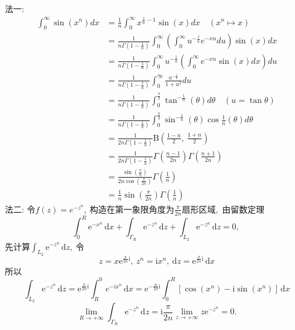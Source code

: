 	\begin{solution}
		法一:
		$$\begin{aligned}
			\int_{0}^{\infty} \sin \left(x^{n}\right) d x & =\frac{1}{n} \int_{0}^{\infty} x^{\frac{1}{n}-1} \sin (x) d x \quad\left(x^{n} \mapsto x\right) \\
			& =\frac{1}{n \Gamma\left(1-\frac{1}{n}\right)} \int_{0}^{\infty}\left(\int_{0}^{\infty} u^{-\frac{1}{n}} e^{-x u} d u\right) \sin (x) d x \\
			& =\frac{1}{n \Gamma\left(1-\frac{1}{n}\right)} \int_{0}^{\infty} u^{-\frac{1}{n}}\left(\int_{0}^{\infty} e^{-x u} \sin (x) d x\right) d u \\
			& =\frac{1}{n \Gamma\left(1-\frac{1}{n}\right)} \int_{0}^{\infty} \frac{u^{-\frac{1}{n}}}{1+u^{2}} d u \\
			& =\frac{1}{n \Gamma\left(1-\frac{1}{n}\right)} \int_{0}^{\frac{\pi}{2}} \tan ^{-\frac{1}{n}}(\theta) d \theta \quad(u=\tan \theta) \\
			& =\frac{1}{n \Gamma\left(1-\frac{1}{n}\right)} \int_{0}^{\frac{\pi}{2}} \sin ^{-\frac{1}{n}}(\theta) \cos \frac{1}{n}(\theta) d \theta \\
			& =\frac{1}{2 n \Gamma\left(1-\frac{1}{n}\right)} \mathrm{B}\left(\frac{1-n}{2},\  \frac{1+n}{2}\right) \\
			& =\frac{1}{2 n \Gamma\left(1-\frac{1}{n}\right)} \Gamma\left(\frac{n-1}{2 n}\right) \Gamma\left(\frac{n+1}{2 n}\right) \\
			& =\frac{\sin \left(\frac{\pi}{n}\right)}{2 n \cos \left(\frac{\pi}{2 n}\right)} \Gamma\left(\frac{1}{n}\right) \\
			& =\frac{1}{n} \sin \left(\frac{\pi}{2 n}\right) \Gamma\left(\frac{1}{n}\right)
		\end{aligned}$$
		法二:
		令$f(z)=e^{-z^n},\ $构造在第一象限角度为$\frac{\pi}{2n}$扇形区域,\ 由留数定理
		$$\int_{0}^{R}\mathrm{e}^{-x^n}\,\mathrm{d}x+\int_{\Gamma_R}\mathrm{e}^{-z^n}\,\mathrm{d}z+\int_{L_2}\mathrm{e}^{-z^n}\,\mathrm{d}z=0,\ $$
		先计算$\int_{L_2}\mathrm{e}^{-z^n}\,\mathrm{d}z,\ $令
		$$z=x\mathrm{e}^{\frac{\pi}{2n}\mathrm{i}},\ z^n=\mathrm{i}x^n,\ \mathrm{d}z=\mathrm{e}^{\frac{\pi}{2n}\mathrm{i}}\,\mathrm{d}x$$
		所以
		$$\int_{L_2}\mathrm{e}^{-z^n}\,\mathrm{d}z=\mathrm{e}^{\frac{\pi}{2n}\mathrm{i}}\int_{R}^{0}e^{-\mathrm{i}x^n}\,\mathrm{d}x=\mathrm{e}^{-\frac{n}{2\pi}\mathrm{i}}\int_{0}^{R}\left[\cos(x^n)-\mathrm{i}\sin(x^n)\right]\,\mathrm{d}x$$
		$$\lim\limits_{R\rightarrow+\infty}\int_{\Gamma_R}\mathrm{e}^{-z^n}\,\mathrm{d}z=\mathrm{i}\frac{\pi}{2n}\lim\limits_{z\rightarrow+\infty}z\mathrm{e}^{-z^n}=0.$$

\end{solution}
